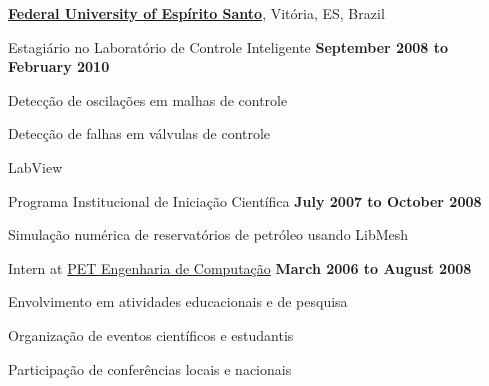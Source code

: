 \documentclass[10pt]{article}
\begin{document}
\href{http://www.ufes.br}{\textbf{Federal University of Espírito Santo}},
Vitória, ES, Brazil
\begin{outerlist}
    
\item[] Estagiário no Laboratório de Controle Inteligente
    \hfill \textbf{September 2008 to February 2010}
    \begin{innerlist}
    \item Detecção de oscilações em malhas de controle
    \item Detecção de falhas em válvulas de controle
    \item LabView
    \end{innerlist}

\item[] Programa Institucional de Iniciação Científica
    \hfill \textbf{July 2007 to October 2008}
    \begin{innerlist}
    \item Simulação numérica de reservatórios de petróleo usando LibMesh
    \end{innerlist}

\item[] Intern at \href{http://www.ufes.br/~pet}{PET Engenharia de Computação}
    \hfill \textbf{March 2006 to August 2008}
    \begin{innerlist}
    \item Envolvimento em atividades educacionais e de pesquisa
    \item Organização de eventos científicos e estudantis
    \item Participação de conferências locais e nacionais
    \end{innerlist}

\end{outerlist}
\end{document}
